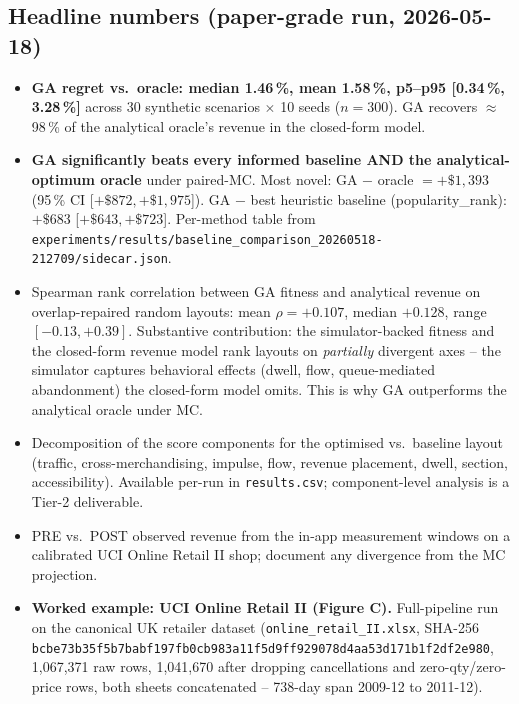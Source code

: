 \documentclass[11pt]{article}
\begin{document}
\subsection*{Headline numbers (paper-grade run, 2026-05-18)}
\begin{itemize}[leftmargin=*]
  \item \textbf{GA regret vs.\ oracle: median 1.46\,\%, mean 1.58\,\%,
    p5--p95 [0.34\,\%, 3.28\,\%]} across 30 synthetic scenarios
    $\times$ 10 seeds ($n{=}300$). GA recovers $\approx${}98\,\% of
    the analytical oracle's revenue in the closed-form model.
  \item \textbf{GA significantly beats every informed baseline AND
    the analytical-optimum oracle} under paired-MC. Most novel:
    GA $-$ oracle $= +\$1{,}393$ (95\,\% CI [$+\$872, +\$1{,}975$]).
    GA $-$ best heuristic baseline (popularity\_rank): $+\$683$
    [$+\$643, +\$723$]. Per-method table from
    \texttt{experiments/results/baseline\_comparison\_20260518-212709/sidecar.json}.
  \item Spearman rank correlation between GA fitness and analytical
    revenue on overlap-repaired random layouts: mean
    $\rho={+}0.107$, median ${+}0.128$, range $[{-}0.13, {+}0.39]$.
    Substantive contribution: the simulator-backed fitness and the
    closed-form revenue model rank layouts on \emph{partially}
    divergent axes -- the simulator captures behavioral effects
    (dwell, flow, queue-mediated abandonment) the closed-form
    model omits. This is why GA outperforms the analytical oracle
    under MC.
  \item Decomposition of the score components for the optimised vs.\
    baseline layout (traffic, cross-merchandising, impulse, flow,
    revenue placement, dwell, section, accessibility). Available
    per-run in \texttt{results.csv}; component-level analysis is
    a Tier-2 deliverable.
  \item PRE vs.\ POST observed revenue from the in-app measurement
    windows on a calibrated UCI Online Retail II shop; document any
    divergence from the MC projection.
  \item \textbf{Worked example: UCI Online Retail II (Figure C).}
    Full-pipeline run on the canonical UK retailer dataset
    (\texttt{online\_retail\_II.xlsx},
    SHA-256 \texttt{bcbe73b35f5b7babf197fb0cb983a11f5d9ff929078d4aa53d171b1f2df2e980},
    1{,}067{,}371 raw rows, 1{,}041{,}670 after dropping cancellations
    and zero-qty/zero-price rows, both sheets concatenated -- 738-day
    span 2009-12 to 2011-12).

\end{itemize}
\end{document}
